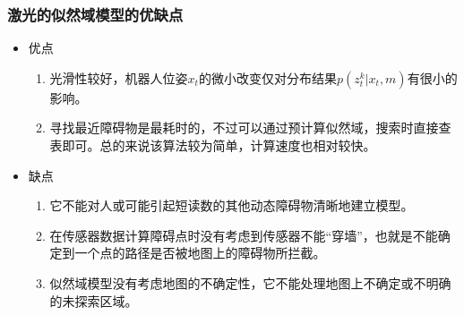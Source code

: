 \begin{frame}
  \frametitle{激光的似然域模型的优缺点}
  \begin{itemize}
    \item 优点
    \begin{enumerate}
      \item 光滑性较好，机器人位姿$x_t$的微小改变仅对分布结果$p(z_t^k|x_t,m)$有很小的影响。
      \item 寻找最近障碍物是最耗时的，不过可以通过预计算似然域，搜索时直接查表即可。总的来说该算法较为简单，计算速度也相对较快。
    \end{enumerate}
    \item 缺点
    \begin{enumerate}
      \item 它不能对人或可能引起短读数的其他动态障碍物清晰地建立模型。
      \item 在传感器数据计算障碍点时没有考虑到传感器不能“穿墙”，也就是不能确定到一个点的路径是否被地图上的障碍物所拦截。
      \item 似然域模型没有考虑地图的不确定性，它不能处理地图上不确定或不明确的未探索区域。
    \end{enumerate}
  \end{itemize}
\end{frame}